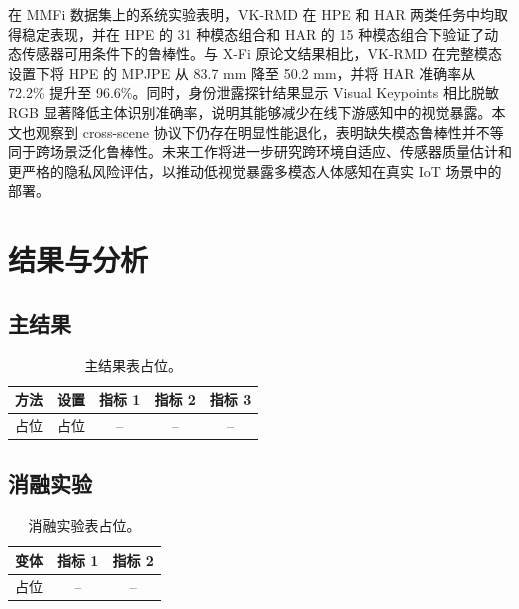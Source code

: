 \documentclass[journal]{IEEEtran}
\begin{document}
在 MMFi 数据集上的系统实验表明，VK-RMD 在 HPE 和 HAR 两类任务中均取得稳定表现，并在 HPE 的 31 种模态组合和 HAR 的 15 种模态组合下验证了动态传感器可用条件下的鲁棒性。与 X-Fi 原论文结果相比，VK-RMD 在完整模态设置下将 HPE 的 MPJPE 从 83.7 mm 降至 50.2 mm，并将 HAR 准确率从 72.2\% 提升至 96.6\%。同时，身份泄露探针结果显示 Visual Keypoints 相比脱敏 RGB 显著降低主体识别准确率，说明其能够减少在线下游感知中的视觉暴露。本文也观察到 cross-scene 协议下仍存在明显性能退化，表明缺失模态鲁棒性并不等同于跨场景泛化鲁棒性。未来工作将进一步研究跨环境自适应、传感器质量估计和更严格的隐私风险评估，以推动低视觉暴露多模态人体感知在真实 IoT 场景中的部署。

\section{结果与分析}

\subsection{主结果}

\begin{table}[!t]
    \centering
    \caption{主结果表占位。}
    \label{tab:main_results}
    \begin{tabular}{lcccc}
        \toprule
        方法 & 设置 & 指标 1 & 指标 2 & 指标 3 \\
        \midrule
        占位 & 占位 & -- & -- & -- \\
        \bottomrule
    \end{tabular}
\end{table}

\subsection{消融实验}

\begin{table}[!t]
    \centering
    \caption{消融实验表占位。}
    \label{tab:ablation}
    \begin{tabular}{lcc}
        \toprule
        变体 & 指标 1 & 指标 2 \\
        \midrule
        占位 & -- & -- \\
        \bottomrule
    \end{tabular}
\end{table}
\end{document}

